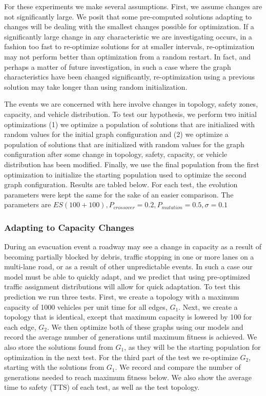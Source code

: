 \documentclass{sig-alternate-05-2015}
\begin{document}
			For these experiments we make several assumptions. First, we assume changes are not significantly large. We posit that some pre-computed solutions adapting to changes will be dealing with the smallest changes possible for optimization. If a significantly large change in any characteristic we are investigating occurs, in a fashion too fast to re-optimize solutions for at smaller intervals, re-optimization may not perform better than optimization from a random restart. In fact, and perhaps a matter of future investigation, in such a case where the graph characteristics have been changed significantly, re-optimization using a previous solution may take longer than using random initialization.
			
			The events we are concerned with here involve changes in topology, safety zones, capacity, and vehicle distribution. To test our hypothesis, we perform two initial optimizations (1) we optimize a population of solutions that are initialized with random values for the initial graph configuration and (2) we optimize a population of solutions that are initialized with random values for the graph configuration after some change in topology, safety, capacity, or vehicle distribution has been modified. Finally, we use the final population from the first optimization to initialize the starting population used to optimize the second graph configuration. Results are tabled below.
			For each test, the evolution parameters were kept the same for the sake of an easier comparison. The parameters are $ES(100+100), P_{crossover}=0.2, P_{mutation}=0.5, \sigma=0.1$

			\subsubsection{Adapting to Capacity Changes}
			During an evacuation event a roadway may see a change in capacity as a result of becoming partially blocked by debris, traffic stopping in one or more lanes on a multi-lane road, or as a result of other unpredictable events. In such a case our model must be able to quickly adapt, and we predict that using pre-optimized traffic assignment distributions will allow for quick adaptation. To test this prediction we run three tests. First, we create a topology with a maximum capacity of 1000 vehicles per unit time for all edges, $G_1$. Next, we create a topology that is identical, except that maximum capacity is lowered by 100 for each edge, $G_2$. We then optimize both of these graphs using our models and record the average number of generations until maximum fitness is achieved. We also store the solutions found from $G_1$, as they will be the starting population for optimization in the next test. For the third part of the test we re-optimize $G_2$, starting with the solutions from $G_1$. We record and compare the number of generations needed to reach maximum fitness below. We also show the average time to safety (TTS) of each test, as well as the test topology.
			
\end{document}
